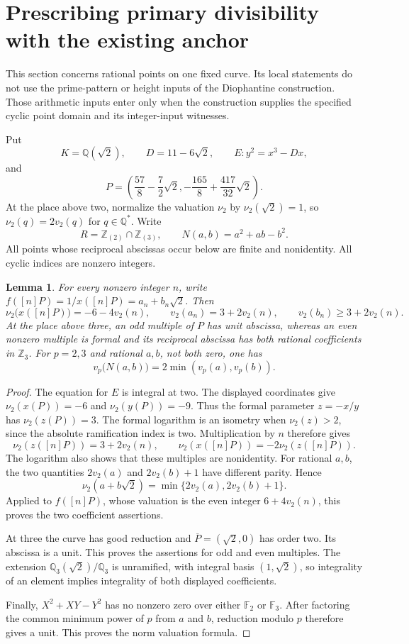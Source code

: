 \documentclass[11pt,a4paper]{article}
\newtheorem{lemma}[theorem]{Lemma}
\theoremstyle{definition}
\theoremstyle{remark}
\begin{document}
\section{Prescribing primary divisibility with the existing anchor}
\label{sec:primary-depth-anchor}

This section concerns rational points on one fixed curve.  Its local
statements do not use the prime-pattern or height inputs of the
Diophantine construction.  Those arithmetic inputs enter only when
the construction supplies the specified cyclic point domain and its
integer-input witnesses.

Put
\[
 K=\mathbb Q(\sqrt2),\qquad D=11-6\sqrt2,\qquad
 E:y^2=x^3-Dx,
\]
and
\[
 P=\left(\frac{57}{8}-\frac72\sqrt2,
          -\frac{165}{8}+\frac{417}{32}\sqrt2\right).
\]
At the place above two, normalize the valuation $\nu_2$ by
$\nu_2(\sqrt2)=1$, so $\nu_2(q)=2v_2(q)$ for $q\in\mathbb Q^*$.
Write
\[
 R=\mathbb Z_{(2)}\cap\mathbb Z_{(3)},\qquad
 N(a,b)=a^2+ab-b^2.
\]
All points whose reciprocal abscissas occur below are finite and
nonidentity.  All cyclic indices are nonzero integers.

\begin{lemma}\label{pdanchor:local-coefficients}
For every nonzero integer $n$, write
$f([n]P)=1/x([n]P)=a_n+b_n\sqrt2$.  Then
\[
 \nu_2\bigl(x([n]P)\bigr)=-6-4v_2(n),\qquad
 v_2(a_n)=3+2v_2(n),\qquad
 v_2(b_n)\ge3+2v_2(n).
\]
At the place above three, an odd multiple of $P$ has unit
abscissa, whereas an even nonzero multiple is formal and its
reciprocal abscissa has both rational coefficients in $\mathbb Z_3$.
For $p=2,3$ and rational $a,b$, not both zero, one has
\[
             v_p\bigl(N(a,b)\bigr)=2\min(v_p(a),v_p(b)).
\]
\end{lemma}
\begin{proof}
The equation for $E$ is integral at two.  The displayed coordinates
give $\nu_2(x(P))=-6$ and $\nu_2(y(P))=-9$.  Thus the formal
parameter $z=-x/y$ has $\nu_2(z(P))=3$.  The formal logarithm
is an isometry when $\nu_2(z)>2$, since the absolute ramification
index is two.  Multiplication by $n$ therefore gives
\[
 \nu_2(z([n]P))=3+2v_2(n),\qquad
 \nu_2(x([n]P))=-2\nu_2(z([n]P)).
\]
The logarithm also shows that these multiples are nonidentity.
For rational $a,b$, the two quantities $2v_2(a)$ and
$2v_2(b)+1$ have different parity.  Hence
\[
 \nu_2(a+b\sqrt2)=\min\{2v_2(a),2v_2(b)+1\}.
\]
Applied to $f([n]P)$, whose valuation is the even integer
$6+4v_2(n)$, this proves the two coefficient assertions.

At three the curve has good reduction and
$\overline P=(\sqrt2,0)$ has order two.  Its abscissa is a unit.
This proves the assertions for odd and even multiples.  The
extension $\mathbb Q_3(\sqrt2)/\mathbb Q_3$ is unramified,
with integral basis $(1,\sqrt2)$, so integrality of an element
implies integrality of both displayed coefficients.

Finally, $X^2+XY-Y^2$ has no nonzero zero over either
$\mathbb F_2$ or $\mathbb F_3$.  After factoring the common
minimum power of $p$ from $a$ and $b$, reduction modulo $p$
therefore gives a unit.  This proves the norm valuation formula.
\end{proof}
\end{document}
